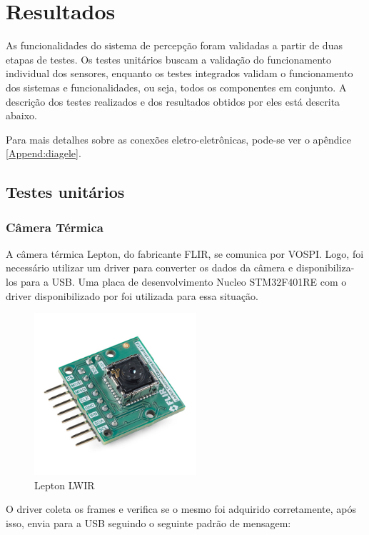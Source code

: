 \chapter{Resultados}
\label{chap:result}

As funcionalidades do sistema de percepção foram validadas a partir de duas etapas de testes. Os testes unitários buscam a validação do funcionamento individual dos sensores, enquanto os testes integrados validam o funcionamento dos sistemas e funcionalidades, ou seja, todos os componentes em conjunto. A descrição dos testes realizados e dos resultados obtidos por eles está descrita abaixo.

Para mais detalhes sobre as conexões eletro-eletrônicas, pode-se ver o apêndice \ref{Append:diagele}.

\section{Testes unitários}
\label{sec:testu}

	\subsection{Câmera Térmica}
	
		A câmera térmica Lepton, do fabricante FLIR, se comunica por VOSPI. Logo, foi necessário utilizar um driver para converter os dados da câmera e disponibiliza-los para a USB. Uma placa de desenvolvimento Nucleo STM32F401RE com o driver disponibilizado por  foi utilizada para essa situação.
		
		\begin{figure}[!ht]
		   \centering
		   \includegraphics[width=6cm]{Figures/lepton_flir.jpg}
		   \caption{Lepton LWIR}
		   \label{fig:lepton}
		\end{figure}
		
		O driver coleta os frames e verifica se o mesmo foi adquirido corretamente, após isso, envia para a USB seguindo o seguinte padrão de mensagem:
		    
